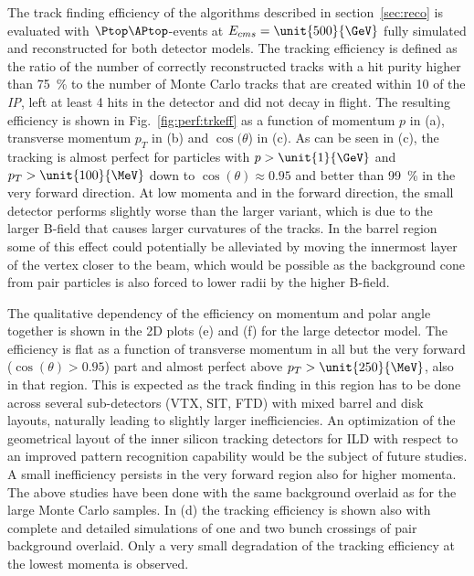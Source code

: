 The track finding efficiency of the algorithms described in section~\ref{sec:reco} is evaluated with $\Ptop\APtop$-events
at $E_{cms}=\unit{500}{\GeV}$ fully simulated and reconstructed for both detector models.
The tracking efficiency is defined as the ratio of the number of correctly reconstructed tracks with a hit purity higher than 75~\% to the
number of Monte Carlo tracks that are created within \unit{10}{\cm} of the {\em IP}, left at least 4 hits in the detector and
did not decay in flight. The resulting efficiency is shown in Fig.~\ref{fig:perf:trkeff} as a function of momentum $p$ in (a),
transverse momentum $p_T$ in (b) and $\cos(\theta$) in (c). As can be seen in (c), the tracking is almost perfect for particles
with $p>\unit{1}{\GeV}$ and $p_T>\unit{100}{\MeV}$ down to $\cos(\theta) \approx 0.95$ and better than 99~\% in the very forward
direction. At low momenta and in the forward direction, the small detector performs slightly worse than the larger variant, which
is due to the larger B-field that causes larger curvatures of the tracks. In the barrel region some of this effect could potentially
be alleviated by moving the innermost layer of the vertex closer to the beam, which would be possible as the background cone from
pair particles is also forced to lower radii by the higher B-field.

The qualitative dependency of the efficiency on momentum and polar angle together is shown in the 2D plots (e) and (f) for the large
detector model. The efficiency is flat as a function of transverse momentum in all but the very forward ($\cos(\theta)>0.95$)
part and almost perfect above $p_T>\unit{250}{\MeV}$, also in that region. This is expected as the track finding in this region has to be done
across several sub-detectors (VTX, SIT, FTD) with mixed barrel and disk layouts, naturally leading to slightly larger inefficiencies.
An optimization of the geometrical layout of the inner silicon tracking detectors for ILD with respect to an improved pattern recognition
capability would be the subject of future studies.
A small inefficiency persists in the very forward region also for higher momenta.
The above studies have been done with the same background overlaid as for the large Monte Carlo samples.
In (d) the tracking efficiency is shown also with complete and detailed simulations of one and two bunch crossings of pair
background overlaid. Only a very small degradation of the tracking efficiency at the lowest momenta is observed.

